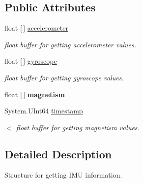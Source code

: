 \subsection*{Public Attributes}
\begin{DoxyCompactItemize}
\item 
\mbox{\label{struct_ximmerse_1_1_input_system_1_1_x_device_plugin_1_1_act_param___i_m_u_info_af8ef66f54334675d6c0fd1956b5e0fd2}} 
float \mbox{[}$\,$\mbox{]} \mbox{\hyperlink{struct_ximmerse_1_1_input_system_1_1_x_device_plugin_1_1_act_param___i_m_u_info_af8ef66f54334675d6c0fd1956b5e0fd2}{accelerometer}}
\begin{DoxyCompactList}\small\item\em float buffer for getting accelerometer values. \end{DoxyCompactList}\item 
\mbox{\label{struct_ximmerse_1_1_input_system_1_1_x_device_plugin_1_1_act_param___i_m_u_info_a3dd0ccb8024b07c074cb837d98bb1fc7}} 
float \mbox{[}$\,$\mbox{]} \mbox{\hyperlink{struct_ximmerse_1_1_input_system_1_1_x_device_plugin_1_1_act_param___i_m_u_info_a3dd0ccb8024b07c074cb837d98bb1fc7}{gyroscope}}
\begin{DoxyCompactList}\small\item\em float buffer for getting gyroscope values. \end{DoxyCompactList}\item 
\mbox{\label{struct_ximmerse_1_1_input_system_1_1_x_device_plugin_1_1_act_param___i_m_u_info_a8d2719f94fcadf5c18e25e9b48616e7e}} 
float \mbox{[}$\,$\mbox{]} {\bfseries magnetism}
\item 
System.\+U\+Int64 \mbox{\hyperlink{struct_ximmerse_1_1_input_system_1_1_x_device_plugin_1_1_act_param___i_m_u_info_a937f5d19f1c3d91774a83f1421a26dc4}{timestamp}}
\begin{DoxyCompactList}\small\item\em $<$ float buffer for getting magnetism values. \end{DoxyCompactList}\end{DoxyCompactItemize}


\subsection{Detailed Description}
Structure for getting I\+MU information. ~\newline
 

